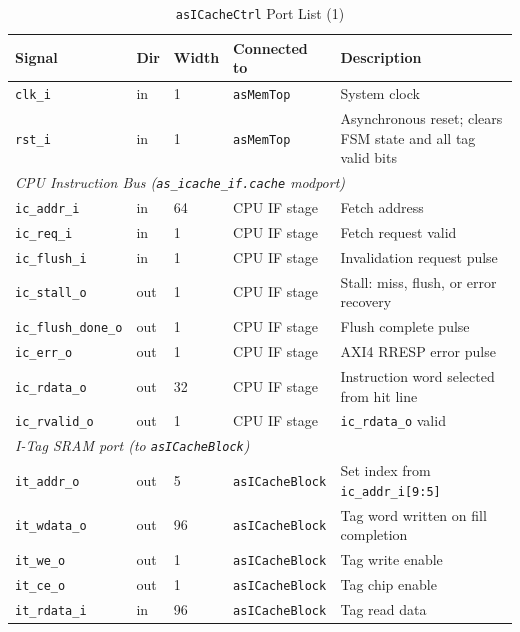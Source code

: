\begin{table}[H]
\caption{\texttt{asICacheCtrl} Port List (1)}
\label{tab:asICacheCtrlPorts}
\centering
\begin{tabularx}{\textwidth}{|l |l |l |l |X|}
  \hline
  Signal & Dir & Width & Connected to & Description \\
  \hline
  \hline
  \texttt{clk\_i}  & in & 1 & \texttt{asMemTop} & System clock \\
  \hline
  \texttt{rst\_i}  & in & 1 & \texttt{asMemTop} & Asynchronous reset; clears FSM state and all tag valid bits \\
  \hline
  \multicolumn{5}{|l|}{\textit{CPU Instruction Bus (\texttt{as\_icache\_if.cache} modport)}} \\
  \hline
  \texttt{ic\_addr\_i}        & in  & 64 & CPU IF stage & Fetch address \\
  \hline
  \texttt{ic\_req\_i}         & in  & 1  & CPU IF stage & Fetch request valid \\
  \hline
  \texttt{ic\_flush\_i}       & in  & 1  & CPU IF stage & Invalidation request pulse \\
  \hline
  \texttt{ic\_stall\_o}       & out & 1  & CPU IF stage & Stall: miss, flush, or error recovery \\
  \hline
  \texttt{ic\_flush\_done\_o} & out & 1  & CPU IF stage & Flush complete pulse \\
  \hline
  \texttt{ic\_err\_o}         & out & 1  & CPU IF stage & AXI4 RRESP error pulse \\
  \hline
  \texttt{ic\_rdata\_o}       & out & 32 & CPU IF stage & Instruction word selected from hit line \\
  \hline
  \texttt{ic\_rvalid\_o}      & out & 1  & CPU IF stage & \texttt{ic\_rdata\_o} valid \\
  \hline
  \multicolumn{5}{|l|}{\textit{I-Tag SRAM port (to \texttt{asICacheBlock})}} \\
  \hline
  \texttt{it\_addr\_o}  & out & 5  & \texttt{asICacheBlock} & Set index from \texttt{ic\_addr\_i[9:5]} \\
  \hline
  \texttt{it\_wdata\_o} & out & 96 & \texttt{asICacheBlock} & Tag word written on fill completion \\
  \hline
  \texttt{it\_we\_o}    & out & 1  & \texttt{asICacheBlock} & Tag write enable \\
  \hline
  \texttt{it\_ce\_o}    & out & 1  & \texttt{asICacheBlock} & Tag chip enable \\
  \hline
  \texttt{it\_rdata\_i} & in  & 96 & \texttt{asICacheBlock} & Tag read data \\

\end{tabularx}
\end{table}
